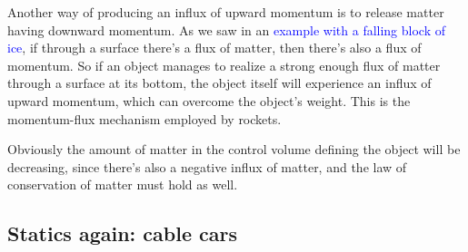 \documentclass[a4paper,12pt,%
onecolumn,oneside,titlepage,%
british%
]{memoir}
\renewcommand*{\bm}[1]{\textpdfrender{TextRenderingMode=2,LineWidth=0.3pt}{\boldsymbol{#1}}}
\renewcommand*{\|}[1][]{\nonscript\:#1\vert\nonscript\:\mathopen{}}
\newcommand*{\sect}{\S}%
\renewcommand*{\autoref}[2]{\sidepar{\vspace{-1ex}\footnotesize{\color{blue}\faIcon{%
reply%
}\enspace\sect\,\ref{#1} page\,\pageref{#1}}}\textcolor{blue}{#2}}
\newcommand*{\yvs}{\bm{v}_{\text{s}}}
\newcommand*{\yJ}{J}
\newcommand*{\yrho}{\rho}
\begin{document}
Another way of producing an influx of upward momentum is to release matter having downward momentum. As we saw in an \autoref{sec:example_balance_static}{example with a falling block of ice}, if through a surface there's a flux of matter, then there's also a flux of momentum. So if an object manages to realize a strong enough flux of matter through a surface at its bottom, the object itself will experience an influx of upward momentum, which can overcome the object's weight. This is the momentum-flux mechanism employed by rockets.

Obviously the amount of matter in the control volume defining the object will be decreasing, since there's also a negative influx of matter, and the law of conservation of matter must hold as well.

% 



\subsection{Statics again: cable cars}
\label{sec:bal_momentum_cablecar}
\end{document}
